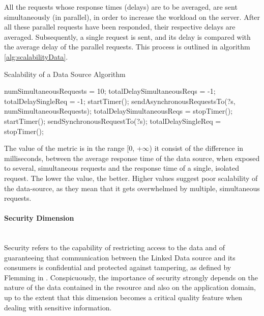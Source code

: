 All the requests whose response times (delays) are to be averaged, are sent simultaneously (in parallel), in order to increase the workload on the server. After all these parallel requests have been responded, their respective delays are averaged. Subsequently, a single request is sent, and its delay is compared with the average delay of the parallel requests. This process is outlined in algorithm \ref{alg:scalabilityData}.
\begin{algorithm}
\caption{Scalability of a Data Source Algorithm} \label{alg:scalabilityData}
\begin{algorithmic}[1]
\State numSimultaneousRequests = 10;
\State totalDelaySimultaneousReqs = -1;
\State totalDelaySingleReq = -1;
\EndProcedure
{}
\State startTimer();
\State sendAsynchronousRequestsTo(?s, numSimultaneousRequests);
\State totalDelaySimultaneousReqs = stopTimer();
\State startTimer();
\State sendSynchronousRequestTo(?s);
\State totalDelaySingleReq = stopTimer();
\EndIf
{}
\EndProcedure
\end{algorithmic}
\end{algorithm}
The value of the metric is in the range [0, +$\infty$) it consist of the difference in milliseconds, between the average response time of the data source, when exposed to several, simultaneous requests and the response time of a single, isolated request. The lower the value, the better. Higher values suggest poor scalability of the data-source, as they mean that it gets overwhelmed by multiple, simultaneous requests.



\paragraph{Security Dimension}~\\ %
Security refers to the capability of restricting access to the data and of guaranteeing that communication between the Linked Data source and its consumers is confidential and protected against tampering, as defined by Flemming in \cite{Flemming2010}. Conspicuously, the importance of security strongly depends on the nature of the data contained in the resource and also on the application domain, up to the extent that this dimension becomes a critical quality feature when dealing with sensitive information.


